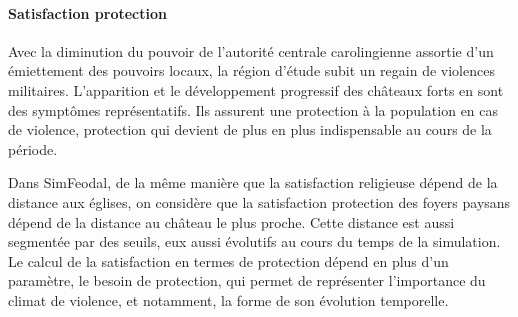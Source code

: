 \paragraph{Satisfaction \og protection\fg{}} 
Avec la diminution du pouvoir de l'autorité centrale carolingienne assortie d'un émiettement des pouvoirs locaux, la région d'étude subit un regain de violences militaires.
L'apparition et le développement progressif des châteaux forts en sont des symptômes représentatifs.
Ils assurent une protection à la population en cas de violence, protection qui devient de plus en plus indispensable au cours de la période.

\begin{tcolorbox}[breakable,left=0pt,right=0pt,top=0pt,bottom=0pt,
	colback=gray!15,colframe=gray!15,width=\dimexpr\textwidth\relax, 
	enlarge left by=0mm, boxsep=5pt,arc=0pt,outer arc=0pt]
	Dans SimFeodal, de la même manière que la satisfaction religieuse dépend de la distance aux églises, on considère que la satisfaction \og protection\fg{} des foyers paysans dépend de la distance au château le plus proche.
	Cette distance est aussi segmentée par des seuils, eux aussi évolutifs au cours du temps de la simulation.
	Le calcul de la satisfaction en termes de protection dépend en plus d'un paramètre, le \og besoin de protection\fg{}, qui permet de représenter l'importance du climat de violence, et notamment, la forme de son évolution temporelle.
\end{tcolorbox}

